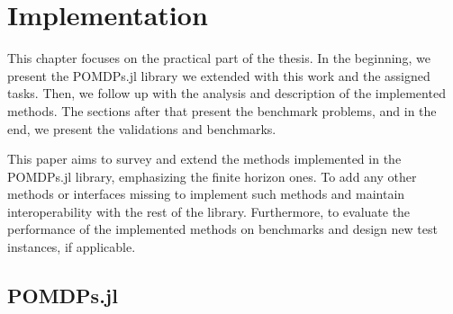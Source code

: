 \chapter{Implementation}

This chapter focuses on the practical part of the thesis. In the beginning, we present the POMDPs.jl library we extended with this work and the assigned tasks. Then, we follow up with the analysis and description of the implemented methods. The sections after that present the benchmark problems, and in the end, we present the validations and benchmarks.

This paper aims to survey and extend the methods implemented in the POMDPs.jl library, emphasizing the finite horizon ones. To add any other methods or interfaces missing to implement such methods and maintain interoperability with the rest of the library. Furthermore, to evaluate the performance of the implemented methods on benchmarks and design new test instances, if applicable.








\section{POMDPs.jl}

